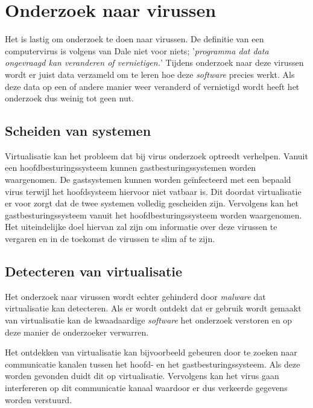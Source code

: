 \documentclass[12pt]{uva-inf-article}
\begin{document}

\section{Onderzoek naar virussen}
Het is lastig om onderzoek te doen naar virussen. De definitie van een computervirus
is volgens van Dale niet voor niets; '\textit{programma dat data ongevraagd kan veranderen
of vernietigen.}' \cite{vandale} Tijdens onderzoek naar deze virussen wordt er juist
data verzameld om te leren hoe deze \textit{software} precies werkt. Als deze data op een
of andere manier weer veranderd of vernietigd wordt heeft het onderzoek dus weinig
tot geen nut.

\subsection{Scheiden van systemen}
Virtualisatie kan het probleem dat bij virus onderzoek optreedt verhelpen.
Vanuit een hoofdbesturingssysteem kunnen gastbesturingssystemen worden waargenomen.
De gastsystemen kunnen worden
ge\"{i}nfecteerd met een bepaald virus terwijl het hoofdsysteem hiervoor niet
vatbaar is. Dit doordat virtualisatie er voor zorgt dat de twee systemen volledig
gescheiden zijn. Vervolgens kan het gastbesturingssysteem vanuit het hoofdbesturingssysteem
worden waargenomen.
Het uiteindelijke doel hiervan zal zijn om informatie over deze
virussen te vergaren en in de toekomst de virussen te slim af te zijn.


\subsection{Detecteren van virtualisatie}
Het onderzoek naar virussen wordt echter gehinderd door \textit{malware} dat
virtualisatie kan detecteren. Als er wordt ontdekt dat er gebruik wordt gemaakt
van virtualisatie kan de kwaadaardige \textit{software} het onderzoek verstoren
en op deze manier de onderzoeker verwarren.

Het ontdekken van virtualisatie kan bijvoorbeeld gebeuren door te zoeken naar
communicatie kanalen tussen het hoofd- en het gastbesturingssysteem. Als deze
worden gevonden duidt dit op virtualisatie. Vervolgens kan het virus gaan interfereren
op dit communicatie kanaal waardoor er dus verkeerde gegevens worden verstuurd.
\end{document}
